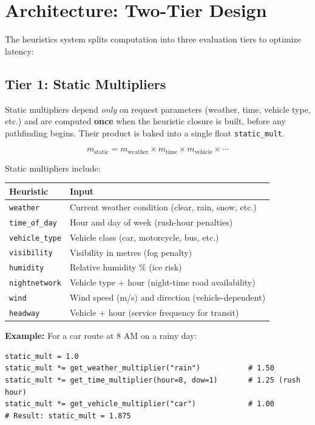 \documentclass[12pt,a4paper]{article}
\begin{document}
\newpage

\section{Architecture: Two-Tier Design}

The heuristics system splits computation into three evaluation tiers to optimize latency:

\subsection{Tier 1: Static Multipliers}

Static multipliers depend \textit{only} on request parameters (weather, time, vehicle type, etc.) and are computed \textbf{once} when the heuristic closure is built, before any pathfinding begins. Their product is baked into a single float \texttt{static\_mult}.

\[
m_{\text{static}} = m_{\text{weather}} \times m_{\text{time}} \times m_{\text{vehicle}} \times \cdots
\]

Static multipliers include:

\begin{table}[H]
\centering
\begin{tabular}{ll}
\toprule
\textbf{Heuristic} & \textbf{Input} \\
\midrule
\texttt{weather} & Current weather condition (clear, rain, snow, etc.) \\
\texttt{time\_of\_day} & Hour and day of week (rush-hour penalties) \\
\texttt{vehicle\_type} & Vehicle class (car, motorcycle, bus, etc.) \\
\texttt{visibility} & Visibility in metres (fog penalty) \\
\texttt{humidity} & Relative humidity \% (ice risk) \\
\texttt{nightnetwork} & Vehicle type + hour (night-time road availability) \\
\texttt{wind} & Wind speed (m/s) and direction (vehicle-dependent) \\
\texttt{headway} & Vehicle + hour (service frequency for transit) \\
\bottomrule
\end{tabular}
\end{table}

\textbf{Example:} For a car route at 8 AM on a rainy day:
\begin{lstlisting}
static_mult = 1.0
static_mult *= get_weather_multiplier("rain")           # 1.50
static_mult *= get_time_multiplier(hour=8, dow=1)       # 1.25 (rush hour)
static_mult *= get_vehicle_multiplier("car")            # 1.00
# Result: static_mult = 1.875
\end{lstlisting}
\end{document}
